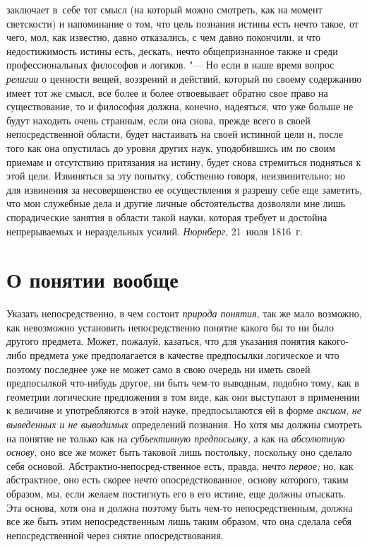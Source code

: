 заключает в~себе тот смысл (на который можно смотреть, как на момент
светскости) и напоминание о том, что цель познания истины есть нечто такое,
от чего, мол, как известно, давно отказались, с чем давно покончили, и
что недостижимость истины есть, дескать, нечто
общепризнанное также и среди профессиональных философов и логиков. "---
Но если в наше время вопрос {\em религии} о ценности
вещей, воззрений и действий, который по своему содержанию имеет тот же
смысл, все более и более отвоевывает обратно свое право на существование,
то и философия должна, конечно, надеяться, что уже больше не будут находить
очень странным, если она снова, прежде всего в своей непосредственной
области, будет настаивать на своей истинной цели и, после того как она
опустилась до уровня других наук, уподобившись им по своим приемам и
отсутствию притязания на истину, будет снова стремиться подняться к этой
цели. Извиняться за эту попытку, собственно говоря, неизвинительно; но для
извинения за несовершенство ее осуществления я разрешу себе еще заметить,
что мои служебные дела и другие личные обстоятельства дозволяли мне лишь
спорадические занятия в области такой науки, которая требует и достойна
непрерываемых и нераздельных усилий.
{\em Нюрнберг}, 21~июля 1816~г.

\clearpage\chapter[О понятии вообще]{О понятии вообще}
Указать непосредственно, в чем состоит {\em природа понятия},
так же мало возможно, как невозможно установить
непосредственно понятие какого бы то ни было другого предмета. Может,
пожалуй, казаться, что для указания понятия какого-либо предмета уже
предполагается в качестве предпосылки логическое и что поэтому последнее
уже не может само в свою очередь ни иметь своей предпосылкой что-нибудь
другое, ни быть чем-то выводным, подобно тому, как в геометрии логические
предложения в том виде, как они выступают в применении к величине и
употребляются в этой науке, предпосылаются ей в форме
{\em аксиом}, {\em не выведенных и не выводимых} определений познания.
Но хотя мы должны смотреть на понятие не только как на {\em субъективную
предпосылку}, а как на {\em абсолютную основу}, оно все же может быть
таковой лишь постольку, поскольку оно сделало себя основой.
Абстрактно-непосред-ственное есть, правда, нечто {\em первое;} но, как
абстрактное, оно есть скорее нечто опосредствованное, основу которого,
таким образом, мы, если желаем постигнуть его в его истине, еще должны
отыскать. Эта основа, хотя она и должна поэтому быть чем-то
непосредственным, должна все же быть этим непосредственным лишь таким
образом, что она сделала себя непосредственной через снятие
опосредствования.

